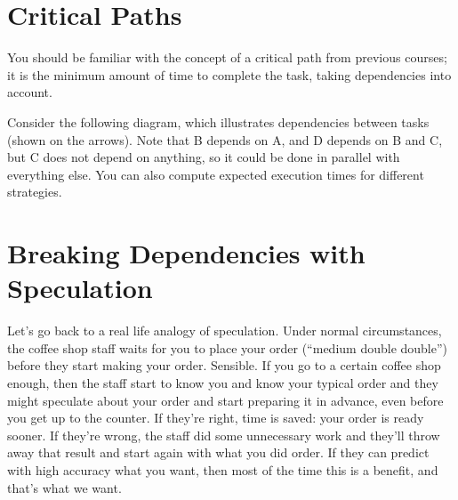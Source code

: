 \documentclass[a4paper]{report}
\begin{document}

\section*{Critical Paths}
You should be familiar with the concept of a critical path from previous
courses; it is the minimum amount of time to complete the task, taking
dependencies into account.

Consider the following diagram, which illustrates dependencies between
tasks (shown on the arrows). 
Note that B depends on A, and D depends on B and C, but C does
not depend on anything, so it could be done in parallel with
everything else. You can also compute expected execution times
for different strategies.
\begin{center}
\end{center}


\section*{Breaking Dependencies with Speculation}
Let's go back to a real life analogy of speculation. Under normal circumstances, the coffee shop staff waits for you to place your order (``medium double double'') before they start making your order. Sensible. If you go to a certain coffee shop enough, then the staff start to know you and know your typical order and they might speculate about your order and start preparing it in advance, even before you get up to the counter. If they're right, time is saved: your order is ready sooner. If they're wrong, the staff did some unnecessary work and they'll throw away that result and start again with what you did order. If they can predict with high accuracy what you want, then most of the time this is a benefit, and that's what we want.
\end{document}
